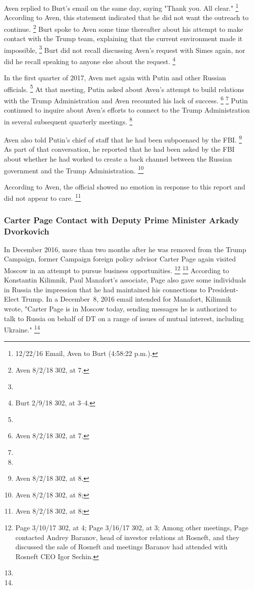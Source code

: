 Aven replied to Burt's email on the same day, saying "Thank you. All clear."%
\footnote{12/22/16 Email, Aven to Burt (4:58:22 p.m.).}
According to Aven, this statement indicated that he did not want the outreach to continue.%
\footnote{Aven 8/2/18 302, at 7.}
Burt spoke to Aven some time thereafter about his attempt to make contact with the Trump team, explaining that the current environment made it impossible,
\footnote{}
Burt did not recall discussing Aven's request with Simes again, nor did he recall speaking to anyone else about the request.%
\footnote{Burt 2/9/18 302, at 3--4.}

In the first quarter of 2017, Aven met again with Putin and other Russian officials.%
\footnote{}
At that meeting, Putin asked about Aven's attempt to build relations with the Trump Administration and Aven recounted his lack of success.%
\footnote{ Aven 8/2/18 302, at 7.}
\footnote{}
Putin continued to inquire about Aven's efforts to connect to the Trump Administration in several subsequent quarterly meetings.%
\footnote{}

Aven also told Putin's chief of staff that he had been subpoenaed by the FBI\null.%
\footnote{Aven 8/2/18 302, at 8.}
As part of that conversation, he reported that he had been asked by the FBI about whether he had worked to create a back channel between the Russian government and the Trump Administration.%
\footnote{Aven 8/2/18 302, at 8; }

According to Aven, the official showed no emotion in response to this report and did not appear to care.%
\footnote{Aven 8/2/18 302, at 8; }

\subsubsection{Carter Page Contact with Deputy Prime Minister Arkady Dvorkovich}

In December 2016, more than two months after he was removed from the Trump Campaign, former Campaign foreign policy advisor Carter Page again visited Moscow in an attempt to pursue business opportunities.%
\footnote{Page 3/10/17 302, at 4;
Page 3/16/17 302, at 3;
 Among other meetings, Page contacted Andrey Baranov, head of investor relations at Rosneft, and they discussed the sale of Rosneft and meetings Baranov had attended with Rosneft CEO Igor Sechin.
}
\footnote{}
According to Konstantin Kilimnik, Paul Manafort's associate, Page also gave some individuals in Russia the impression that he had maintained his connections to President-Elect Trump.
In a December~8, 2016 email intended for Manafort, Kilimnik wrote, "Carter Page is in Moscow today, sending messages he is authorized to talk to Russia on behalf of DT on a range of issues of mutual interest, including Ukraine."%
\footnote{}

